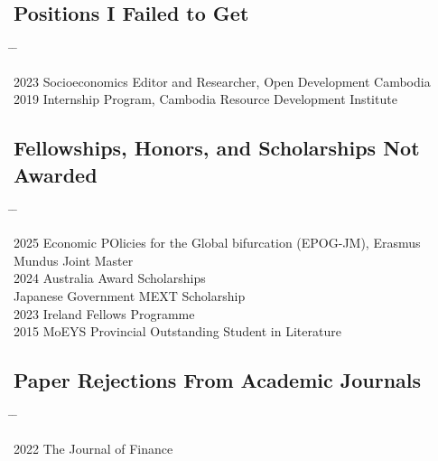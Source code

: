 \documentclass[10pt,a4paper]{article}
\newcommand{\tabbedblock}[1]{

	\begin{tabbing}
		\hspace{2cm} \= \hspace{4cm} \= \kill
		#1
	\end{tabbing}
}
\begin{document}
\subsection*{Positions I Failed to Get} 
	\tabbedblock{
		2023 \> Socioeconomics Editor and Researcher, Open Development Cambodia \\ 
		2019 \> Internship Program, Cambodia Resource Development Institute
	}
\subsection*{Fellowships, Honors, and Scholarships Not Awarded}

\tabbedblock{
	2025 \> Economic POlicies for the Global bifurcation (EPOG-JM), Erasmus Mundus Joint Master \\
	
	2024 \> Australia Award Scholarships \\
			\> Japanese Government MEXT Scholarship \\
	
	2023 \> Ireland Fellows Programme \\
	
	2015 \> MoEYS Provincial Outstanding Student in Literature

}


\subsection*{Paper Rejections From Academic Journals}

\tabbedblock{
	2022 \> The Journal of Finance
	
}
\end{document}
